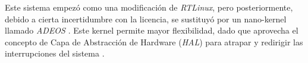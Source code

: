 
Este sistema empezó como una modificación de \textit{RTLinux}, pero posteriormente, debido a cierta incertidumbre con la licencia, se sustituyó por un nano-kernel llamado \textit{ADEOS} \cite{KarimYaghmour2002}. Este kernel permite mayor flexibilidad, dado que aprovecha el concepto de Capa de Abstracción de Hardware (\textit{HAL}) para atrapar y redirigir las interrupciones del sistema \cite{Buttazzo2024}.
